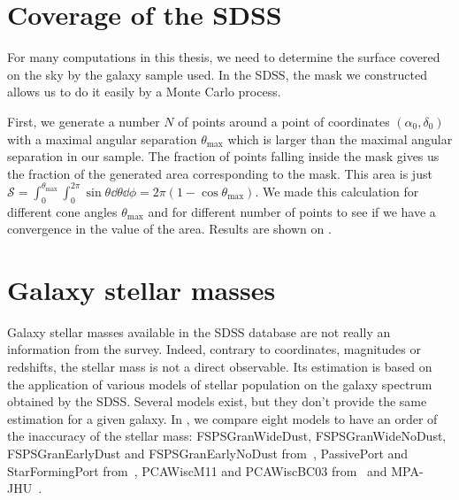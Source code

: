 \section{Coverage of the SDSS}

For many computations in this thesis, we need to determine the surface covered
on the sky by the galaxy sample used. In the SDSS, the mask we constructed
allows us to do it easily by a Monte Carlo process.

First, we generate a number $N$ of points around a point of coordinates
$(\alpha_0, \delta_0)$ with a maximal angular separation $\theta_{\max}$ which
is larger than the maximal angular separation in our sample. The fraction of
points falling inside the mask gives us the fraction of the generated area
corresponding to the mask. This area is just
$\mathcal{S}=\int_0^{\theta_{\max}}\int_0^{2\pi}\sin\theta\dd{\theta}\dd{\phi}=
2\pi\left(1-\cos\theta_{\max}\right)$. We made this calculation for different
cone angles $\theta_{\max}$ and for different number of points to see if we
have a convergence in the value of the area. Results are shown on
.
%

\section{Galaxy stellar masses}

Galaxy stellar masses available in the SDSS database are not really an
information from the survey. Indeed, contrary to coordinates, magnitudes or
redshifts, the stellar mass is not a direct observable. Its estimation is based
on the application of various models of stellar population on the galaxy
spectrum obtained by the SDSS\@. Several models exist, but they don't provide
the same estimation for a given galaxy. In ,
we compare eight models to have an order of the inaccuracy of the stellar mass:
FSPSGranWideDust, FSPSGranWideNoDust, FSPSGranEarlyDust and FSPSGranEarlyNoDust
from~\cite{Conroy+09}, PassivePort and StarFormingPort from~\cite{Maraston+09},
PCAWiscM11 and PCAWiscBC03 from~\cite{Chen+12} and MPA-JHU~\cite{Brinchmann+04,
Kauffmann+03, Tremonti+04}.


